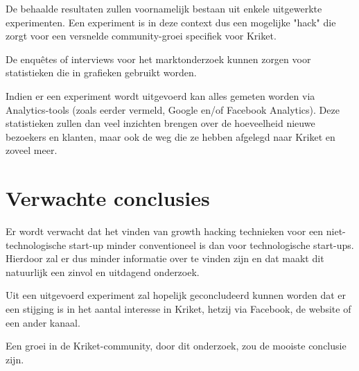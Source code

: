 De behaalde resultaten zullen voornamelijk bestaan uit enkele uitgewerkte experimenten. Een experiment is in deze context dus een mogelijke "hack" die zorgt voor een versnelde community-groei specifiek voor Kriket. 

De enquêtes of interviews voor het marktonderzoek kunnen zorgen voor statistieken die in grafieken gebruikt worden.

Indien er een experiment wordt uitgevoerd kan alles gemeten worden via Analytics-tools (zoals eerder vermeld, Google en/of Facebook Analytics). Deze statistieken zullen dan veel inzichten brengen over de hoeveelheid nieuwe bezoekers en klanten, maar ook de weg die ze hebben afgelegd naar Kriket en zoveel meer.


\section{Verwachte conclusies}
\label{sec:verwachte_conclusies}

Er wordt verwacht dat het vinden van growth hacking technieken voor een niet-technologische start-up minder conventioneel is dan voor technologische start-ups. Hierdoor zal er dus minder informatie over te vinden zijn en dat maakt dit natuurlijk een zinvol en uitdagend onderzoek.

Uit een uitgevoerd experiment zal hopelijk geconcludeerd kunnen worden dat er een stijging is in het aantal interesse in Kriket, hetzij via Facebook, de website of een ander kanaal.

Een groei in de Kriket-community, door dit onderzoek, zou de mooiste conclusie zijn.

